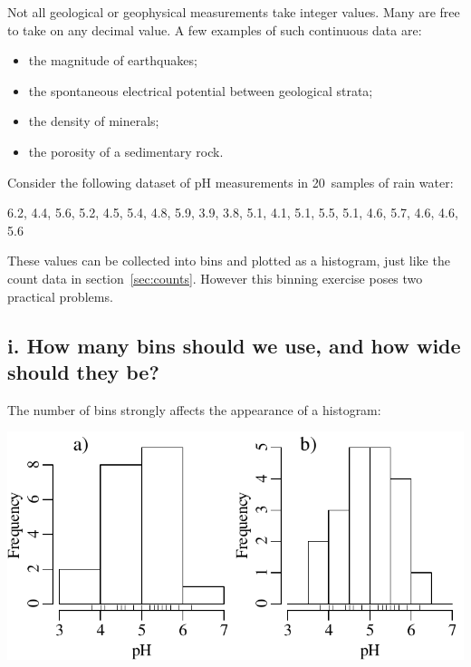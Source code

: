 Not all geological or geophysical measurements take integer values.
Many are free to take on any decimal value. A few examples of such
continuous data are:

\begin{itemize}
\item the magnitude of earthquakes;
\item the spontaneous electrical potential between geological strata;
\item the density of minerals;
\item the porosity of a sedimentary rock.
\end{itemize}

Consider the following dataset of pH measurements in 20~samples of
rain water:

\begin{center}
6.2, 4.4, 5.6, 5.2, 4.5, 5.4, 4.8, 5.9, 3.9, 3.8, 5.1, 4.1, 5.1, 5.5,
5.1, 4.6, 5.7, 4.6, 4.6, 5.6
\end{center}

These values can be collected into bins and plotted as a histogram,
just like the count data in section~\ref{sec:counts}. However this
binning exercise poses two practical problems.

\subsection*{i. How many bins should we use, and how wide should they be?}

The number of bins strongly affects the appearance of a histogram:

\noindent\begin{minipage}[t][][b]{.5\textwidth}
  \includegraphics[width=\textwidth]{../figures/binwidth.pdf}\\
\end{minipage}
\begin{minipage}[t][][t]{.5\textwidth}
  \label{fig:binwidth}
\end{minipage}

